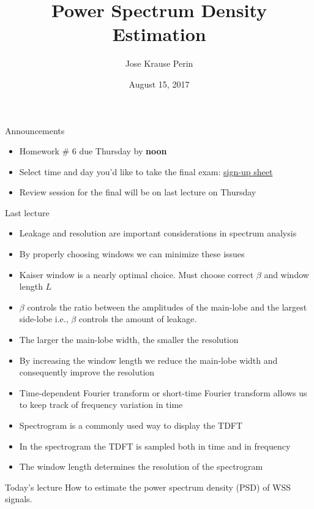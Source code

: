 \documentclass[10pt]{beamer}
\title[EE 264]{Power Spectrum Density Estimation}
\author{Jose Krause Perin}
\institute{Stanford University}
\date{August 15, 2017}
\begin{document}
\begin{frame}
  \titlepage
\end{frame}

%
\begin{frame}{Announcements}
\begin{itemize}
	\item Homework \# 6 due Thursday by \textbf{noon}
	\item Select time and day you'd like to take the final exam: \href{https://docs.google.com/spreadsheets/d/1fps6RCAxMloZ0jjxLB7DXeVGF_Vi5WAW8vqnk6T3erU}{sign-up sheet}
	\item Review session for the final will be on last lecture on Thursday
\end{itemize}
\end{frame}

%
\begin{frame}{Last lecture}
\begin{itemize}
	\item Leakage and resolution are important considerations in spectrum analysis
	\item By properly choosing windows we can minimize these issues
	\item Kaiser window is a nearly optimal choice. Must choose correct $\beta$ and window length $L$
	\item $\beta$ controls the ratio between the amplitudes of the main-lobe and the largest side-lobe i.e., $\beta$ controls the amount of leakage.
	\item The larger the main-lobe width, the smaller the resolution
	\item By increasing the window length we reduce the main-lobe width and consequently improve the resolution
	\item Time-dependent Fourier transform or short-time Fourier transform allows us to keep track of frequency variation in time
	\item Spectrogram is a commonly used way to display the TDFT
	\item In the spectrogram the TDFT is sampled both in time and in frequency
	\item The window length determines the resolution of the spectrogram
\end{itemize}
\end{frame}

%
\begin{frame}{Today's lecture}
	How to estimate the power spectrum density (PSD) of WSS signals.
	\tableofcontents
\end{frame}
\end{document}

